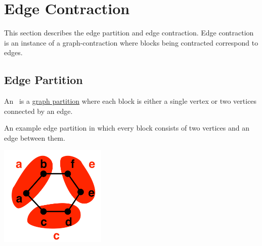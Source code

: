 \chapter{Edge Contraction}
\label{ch:graphcon::edge}

\begin{preamble}
This section describes the edge partition and edge contraction.
%
Edge contraction is an instance of a graph-contraction where blocks
being contracted correspond to edges.
\end{preamble}


\section{Edge Partition}
\label{sec:graphcon::edge::partition}

\begin{flex}

\begin{definition}
\label{def:graphcon::edge::edge-partition}
An~ is a 
%
\href{def:graphcon::intro::prelim::graph-partition}{graph partition}
%
where each block is either a single vertex or two vertices connected
by an edge.
%
\end{definition}

\begin{example}
\label{ex:graphcon::edge-partition}
An example edge partition in which every block consists of two
vertices and an edge between them. 
\begin{center}
\includegraphics[width=2.0in]{./graph-contraction/media-edge/edge-partition-example-1.jpg}
\end{center}
\end{example}


\end{flex}

